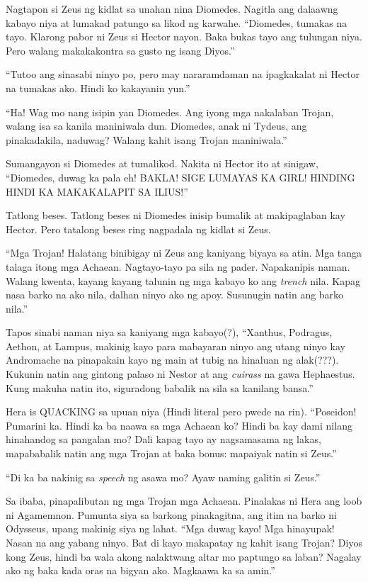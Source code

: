 \documentclass[12pt,letterpaper]{report}
\begin{document}
Nagtapon si Zeus ng kidlat sa unahan nina Diomedes. Nagitla ang dalaawng kabayo niya at lumakad patungo sa likod ng karwahe. ``Diomedes, tumakas na tayo. Klarong pabor ni Zeus si Hector nayon. Baka bukas tayo ang tulungan niya. Pero walang makakakontra sa gusto ng isang Diyos.''

``Tutoo ang sinasabi ninyo po, pero may nararamdaman na ipagkakalat ni Hector na tumakas ako. Hindi ko kakayanin yun.''

``Ha! Wag mo nang isipin yan Diomedes. Ang iyong mga nakalaban Trojan, walang isa sa kanila maniniwala dun. Diomedes, anak ni Tydeus, ang pinakadakila, naduwag? Walang kahit isang Trojan maniniwala.''

Sumangayon si Diomedes at tumalikod. Nakita ni Hector ito at sinigaw, ``Diomedes, duwag ka pala eh! BAKLA! SIGE LUMAYAS KA GIRL! HINDING HINDI KA MAKAKALAPIT SA ILIUS!''

Tatlong beses. Tatlong beses ni Diomedes inisip bumalik at makipaglaban kay Hector. Pero tatalong beses ring nagpadala ng kidlat si Zeus.

``Mga Trojan! Halatang binibigay ni Zeus ang kaniyang biyaya sa atin. Mga tanga talaga itong mga Achaean. Nagtayo-tayo pa sila ng pader. Napakanipis naman. Walang kwenta, kayang kayang talunin ng mga kabayo ko ang \textit{trench} nila. Kapag nasa barko na ako nila, dalhan ninyo ako ng apoy. Susunugin natin ang barko nila.''

Tapos sinabi naman niya sa kaniyang mga kabayo(?), ``Xanthus, Podragus, Aethon, at Lampus, makinig kayo para mabayaran ninyo ang utang ninyo kay Andromache na pinapakain kayo ng main at tubig na hinaluan ng alak(???). Kukunin natin ang gintong palaso ni Nestor at ang \textit{cuirass} na gawa Hephaestus. Kung makuha natin ito, siguradong babalik na sila sa kanilang bansa.''

Hera is QUACKING sa upuan niya (Hindi literal pero pwede na rin). ``Poseidon! Pumarini ka. Hindi ka ba naawa sa mga Achaean ko? Hindi ba kay dami nilang hinahandog sa pangalan mo? Dali kapag tayo ay nagsamasama ng lakas, mapababalik natin ang mga Trojan at baka bonus: mapaiyak natin si Zeus.''

``Di ka ba nakinig sa \textit{speech} ng asawa mo? Ayaw naming galitin si Zeus.''

Sa ibaba, pinapalibutan ng mga Trojan mga Achaean. Pinalakas ni Hera ang loob ni Agamemnon. Pumunta siya sa barkong pinakagitna, ang itim na barko ni Odysseus, upang makinig siya ng lahat. ``Mga duwag kayo! Mga hinayupak! Nasan na ang yabang ninyo. Bat di kayo makapatay ng kahit isang Trojan? Diyos kong Zeus, hindi ba wala akong nalaktwang altar mo paptungo sa laban? Nagalay ako ng baka kada oras na bigyan ako. Magkaawa ka sa amin.''
\end{document}
